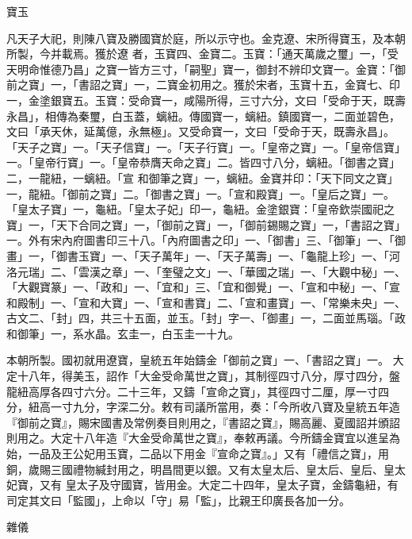 \begin{pinyinscope}
 寶玉



 凡天子大祀，則陳八寶及勝國寶於庭，所以示守也。金克遼、宋所得寶玉，及本朝所製，今并載焉。獲於遼
 者，玉寶四、金寶二。玉寶：「通天萬歲之璽」一，「受天明命惟德乃昌」之寶一皆方三寸，「嗣聖」寶一，御封不辨印文寶一。金寶：「御前之寶」一，「書詔之寶」一，二寶金初用之。獲於宋者，玉寶十五，金寶七、印一，金塗銀寶五。玉寶：受命寶一，咸陽所得，三寸六分，文曰「受命于天，既壽永昌」，相傳為秦璽，白玉蓋，螭紐。傳國寶一，螭紐。鎮國寶一，二面並碧色，文曰「承天休，延萬億，永無極」。又受命寶一，文曰「受命于天，既壽永昌」。「天子之寶」一。「天子信寶」一。「天子行寶」一。「皇帝之寶」一。「皇帝信寶」一。「皇帝行寶」一。「皇帝恭膺天命之寶」二。皆四寸八分，螭紐。「御書之寶」二，一龍紐，一螭紐。「宣
 和御筆之寶」一，螭紐。金寶并印：「天下同文之寶」一，龍紐。「御前之寶」二。「御書之寶」一。「宣和殿寶」一。「皇后之寶」一。「皇太子寶」一，龜紐。「皇太子妃」印一，龜紐。金塗銀寶：「皇帝欽崇國祀之寶」一，「天下合同之寶」一，「御前之寶」一，「御前錫賜之寶」一，「書詔之寶」一。外有宋內府圖書印三十八。「內府圖書之印」一、「御書」三、「御筆」一、「御畫」一，「御書玉寶」一、「天子萬年」一、「天子萬壽」一、「龜龍上珍」一、「河洛元瑞」二、「雲漢之章」一、「奎璧之文」一、「華國之瑞」一、「大觀中秘」一、「大觀寶篆」一、「政和」一、「宜和」三、「宜和御覺」一、「宣和中秘」一、「宣和殿制」一、「宣和大寶」一、「宣和書寶」二、「宣和畫寶」一、「常樂未央」一、古文二、「封」四，共三十五面，並玉。「封」字一、「御畫」一，二面並馬瑙。「政和御筆」一，系水晶。玄圭一，白玉圭一十九。



 本朝所製。國初就用遼寶，皇統五年始鑄金「御前之寶」一、「書詔之寶」一。
 大定十八年，得美玉，詔作「大金受命萬世之寶」，其制徑四寸八分，厚寸四分，盤龍紐高厚各四寸六分。二十三年，又鑄「宣命之寶」，其徑四寸二厘，厚一寸四分，紐高一寸九分，字深二分。敕有司議所當用，奏：「今所收八寶及皇統五年造『御前之寶』，賜宋國書及常例奏目則用之，『書詔之寶』，賜高麗、夏國詔并頒詔則用之。大定十八年造『大金受命萬世之寶』，奉敕再議。今所鑄金寶宜以進呈為始，一品及王公妃用玉寶，二品以下用金『宣命之寶』。」又有「禮信之寶」，用銅，歲賜三國禮物緘封用之，明昌間更以銀。又有太皇太后、皇太后、皇后、皇太妃寶，又有
 皇太子及守國寶，皆用金。大定二十四年，皇太子寶，金鑄龜紐，有司定其文曰「監國」，上命以「守」易「監」，比親王印廣長各加一分。



 雜儀




\end{pinyinscope}
